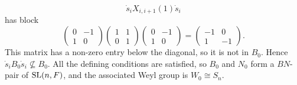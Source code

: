 \documentclass[../Odyssey_Project.tex]{subfiles}
\begin{document}
\begin{solution}
\[
    \dot{s}_iX_{i,i+1}(1)\dot{s}_i
\]
has block
\[
    \begin{pmatrix}
        0&-1\\
        1&0
    \end{pmatrix}
    \begin{pmatrix}
        1&1\\
        0&1
    \end{pmatrix}
    \begin{pmatrix}
        0&-1\\
        1&0
    \end{pmatrix}
    =
    \begin{pmatrix}
        -1&0\\
        1&-1
    \end{pmatrix}.
\]
This matrix has a non-zero entry below the diagonal, so it is not in $B_0$. Hence $\dot{s}_iB_0\dot{s}_i\nsubseteq B_0$. All the defining conditions are satisfied, so $B_0$ and $N_0$ form a $BN$-pair of $\operatorname{SL}(n,F)$, and the associated Weyl group is $W_0\cong S_n$.
\end{solution}
\end{document}
